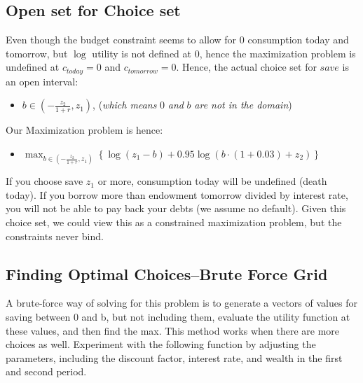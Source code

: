 \documentclass[
]{book}
\providecommand{\tightlist}{%
  \setlength{\itemsep}{0pt}\setlength{\parskip}{0pt}}
\begin{document}
\hypertarget{open-set-for-choice-set}{%
\subsection{Open set for Choice set}\label{open-set-for-choice-set}}

Even though the budget constraint seems to allow for \(0\) consumption
today and tomorrow, but \(\log\) utility is not defined at \(0\), hence the
maximization problem is undefined at \(c_{today} =0\) and
\(c_{tomorrow} =0\). Hence, the actual choice set for \(save\) is an open
interval:

\begin{itemize}
\tightlist
\item
  \(b\in \left(-\frac{z_2 }{1+r},z_1 \right)\), (\emph{which means} \(0\) \emph{and}
  \(b\) \emph{are not in the domain})
\end{itemize}

Our Maximization problem is hence:

\begin{itemize}
\tightlist
\item
  \(\displaystyle \max_{b\in \left(-\frac{z_2 }{1+r},z_1 \right)} \left\lbrace \log (z_1 -b)+0.95\log (b\cdot (1+0.03)+z_2 )\right\rbrace\)
\end{itemize}

If you choose save \(z_1\) or more, consumption today will be undefined
(death today). If you borrow more than endowment tomorrow divided by
interest rate, you will not be able to pay back your debts (we assume no
default). Given this choice set, we could view this as a constrained
maximization problem, but the constraints never bind.

\hypertarget{finding-optimal-choicesbrute-force-grid}{%
\subsection{Finding Optimal Choices--Brute Force Grid}\label{finding-optimal-choicesbrute-force-grid}}

A brute-force way of solving for this problem is to generate a vectors
of values for saving between 0 and b, but not including them, evaluate
the utility function at these values, and then find the max. This method
works when there are more choices as well. Experiment with the following
function by adjusting the parameters, including the discount factor,
interest rate, and wealth in the first and second period.
\end{document}

